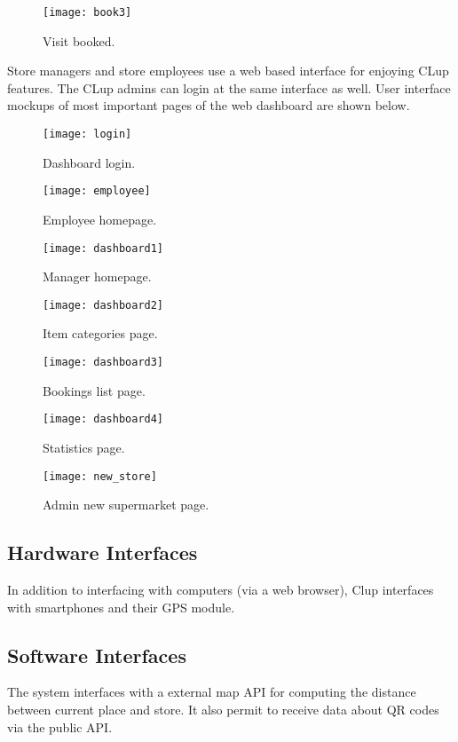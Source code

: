 \clearpage

\begin{figure}[H]
	\centering
	\texttt{[image: book3]}
	\caption{Visit booked.}
\end{figure}

Store managers and store employees use a web based interface for enjoying CLup features. The CLup admins can login at the same interface as well.
User interface mockups of most important pages of the web dashboard are shown below.
\vspace{2em}
\begin{figure}[H]
	\centering
	\texttt{[image: login]}
	\caption{Dashboard login.}
\end{figure}

\begin{figure}[H]
	\centering
	\texttt{[image: employee]}
	\caption{Employee homepage.}
\end{figure}
\begin{figure}[H]
	\centering
	\texttt{[image: dashboard1]}
	\caption{Manager homepage.}
\end{figure}
\begin{figure}[H]
	\centering
	\texttt{[image: dashboard2]}
	\caption{Item categories page.}
\end{figure}
\begin{figure}[H]
	\centering
	\texttt{[image: dashboard3]}
	\caption{Bookings list page.}
\end{figure}
\begin{figure}[H]
	\centering
	\texttt{[image: dashboard4]}
	\caption{Statistics page.}
\end{figure}
\begin{figure}[H]
	\centering
	\texttt{[image: new\_store]}
	\caption{Admin new supermarket page.}
\end{figure}
\clearpage

\subsection{Hardware Interfaces}
In addition to interfacing with computers (via a web browser), Clup interfaces with smartphones and their GPS module.
\subsection{Software Interfaces}
The system interfaces with a external map API for computing the distance between current place and store. It also permit to receive data
about QR codes via the public API.
